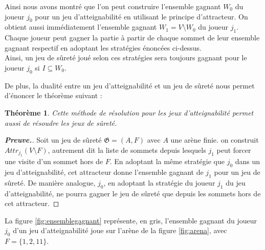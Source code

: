 \documentclass[12pt,a4paper,oneside,titlepage]{report}
\newtheorem{thm}{Th\'eor\`eme}[section]
\newenvironment{demonstration}{\begin{proof}[\textnormal{\textbf{Preuve.}}]}{\end{proof}}
\begin{document}
Ainsi nous avons montré que l'on peut construire l'ensemble gagnant $W_0$ du joueur $j_0$ pour un jeu d'atteignabilité en utilisant le principe d'attracteur. On obtient aussi immédiatement l'ensemble gagnant $W_1=V\setminus W_0$ du joueur $j_1$. Chaque joueur peut gagner la partie à partir de chaque sommet de leur ensemble gagnant respectif en adoptant les stratégies énoncées ci-dessus.\\
Ainsi, un jeu de sûreté joué selon ces stratégies sera toujours gagnant pour le joueur $j_0$ si $I\subseteq W_0$.

\noindent De plus, la dualité entre un jeu d'atteignabilité et un jeu de sûreté nous permet d'énoncer le théorème suivant :

\begin{thm}
	Cette méthode de résolution pour les jeux d'atteignabilité permet aussi de résoudre les jeux de sûreté.
\label{thm:dualite}
\end{thm}
\begin{demonstration}
Soit un jeu de sûreté $\mathfrak{G} = (A, F)$ avec $A$ une arène finie. on construit $Attr_{j_1}(V\setminus F)$, autrement dit la liste de sommets depuis lesquels $j_1$ peut forcer une visite d'un sommet hors de $F$. En adoptant la même stratégie que $j_0$ dans un jeu d'atteignabilité, cet attracteur donne l'ensemble gagnant de $j_1$ pour un jeu de sûreté. De manière analogue, $j_0$, en adoptant la stratégie du joueur $j_1$ du jeu d'atteignabilité, ne pourra gagner le jeu de sûreté que depuis les sommets hors de cet attracteur.
\end{demonstration}
\noindent La figure \ref{fig:ensemblegagnant} représente, en gris, l'ensemble gagnant du joueur $j_0$ d'un jeu d'atteignabilité joue sur l'arène de la figure \ref{fig:arena}, avec $F=\{1,2,11\}$.
\end{document}
